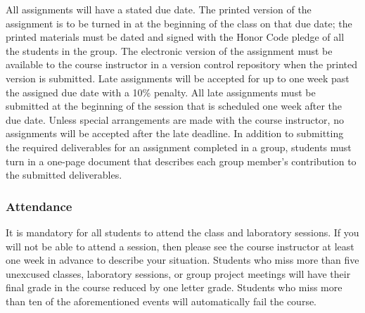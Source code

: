 All assignments will have a stated due date. The printed version of the assignment is to be turned in at the beginning
of the class on that due date; the printed materials must be dated and signed with the Honor Code pledge of all the
students in the group.  The electronic version of the assignment must be available to the course instructor in a version
control repository when the printed version is submitted. Late assignments will be accepted for up to one week past the
assigned due date with a 10\% penalty. All late assignments must be submitted at the beginning of the session that is
scheduled one week after the due date. Unless special arrangements are made with the course instructor, no assignments
will be accepted after the late deadline. In addition to submitting the required deliverables for an assignment
completed in a group, students must turn in a one-page document that describes each group member's contribution to the
submitted deliverables.  

\subsubsection*{Attendance}

It is mandatory for all students to attend the class and laboratory sessions. If you will not be able to attend a
session, then please see the course instructor at least one week in advance to describe your situation.  Students who
miss more than five unexcused classes, laboratory sessions, or group project meetings will have their final grade in the
course reduced by one letter grade. Students who miss more than ten of the aforementioned events will automatically fail
the course.

% 
% 

